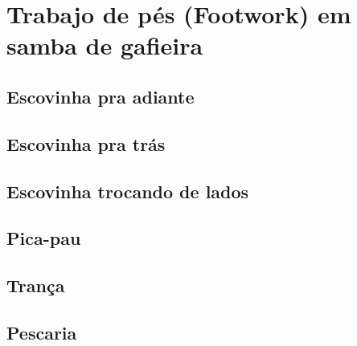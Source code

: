 

\chapter{Trabajo de pés (Footwork) em samba de gafieira}

\section{Escovinha pra adiante}

\section{Escovinha pra trás}

\section{Escovinha trocando de lados}

\section{Pica-pau}

\section{Trança}

\section{Pescaria}



